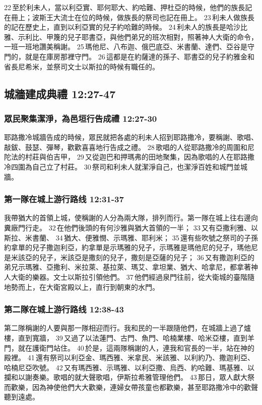 22 至於利未人，當以利亞實、耶何耶大、約哈難、押杜亞的時候，他們的族長記在冊上；波斯王大流士在位的時候，做族長的祭司也記在冊上。 23 利未人做族長的記在歷史上，直到以利亞實的兒子約哈難的時候。 24 利未人的族長是哈沙比雅、示利比、甲篾的兒子耶書亞，與他們弟兄的班次相對，照著神人大衛的命令，一班一班地讚美稱謝。 25 瑪他尼、八布迦、俄巴底亞、米書蘭、達們、亞谷是守門的，就是在庫房那裡守門。 26 這都是在約薩達的孫子、耶書亞的兒子約雅金和省長尼希米，並祭司文士以斯拉的時候有職任的。




\subsection{城牆建成典禮 12:27-47}
\subsubsection{眾民聚集潔淨，為邑垣行告成禮 12:27-30}
耶路撒冷城牆告成的時候，眾民就把各處的利未人招到耶路撒冷，要稱謝、歌唱、敲鈸、鼓瑟、彈琴，歡歡喜喜地行告成之禮。 28 歌唱的人從耶路撒冷的周圍和尼陀法的村莊與伯吉甲， 29 又從迦巴和押瑪弗的田地聚集，因為歌唱的人在耶路撒冷四圍為自己立了村莊。 30 祭司和利未人就潔淨自己，也潔淨百姓和城門並城牆。

\subsubsection{第一隊在城上游行路线 12:31-37}
我帶猶大的首領上城，使稱謝的人分為兩大隊，排列而行。第一隊在城上往右邊向糞廠門行走。 32 在他們後頭的有何沙雅與猶大首領的一半； 33 又有亞撒利雅、以斯拉、米書蘭、 34 猶大、便雅憫、示瑪雅、耶利米； 35 還有些吹號之祭司的子孫約拿單的兒子撒迦利亞，約拿單是示瑪雅的兒子，示瑪雅是瑪他尼的兒子，瑪他尼是米該亞的兒子，米該亞是撒刻的兒子，撒刻是亞薩的兒子； 36 又有撒迦利亞的弟兄示瑪雅、亞撒利、米拉萊、基拉萊、瑪艾、拿坦業、猶大、哈拿尼，都拿著神人大衛的樂器。文士以斯拉引領他們。 37 他們經過泉門往前，從大衛城的臺階隨地勢而上，在大衛宮殿以上，直行到朝東的水門。

\subsubsection{第二隊在城上游行路线 12:38-43}
第二隊稱謝的人要與那一隊相迎而行。我和民的一半跟隨他們，在城牆上過了爐樓，直到寬牆， 39 又過了以法蓮門、古門、魚門、哈楠業樓、哈米亞樓，直到羊門，就在護衛門站住。 40 於是，這兩隊稱謝的人，連我和官長的一半，站在神的殿裡。 41 還有祭司以利亞金、瑪西雅、米拿民、米該雅、以利約乃、撒迦利亞、哈楠尼亞吹號。 42 又有瑪西雅、示瑪雅、以利亞撒、烏西、約哈難、瑪基雅、以攔和以謝奏樂。歌唱的就大聲歌唱，伊斯拉希雅管理他們。 43 那日，眾人獻大祭而歡樂，因為神使他們大大歡樂，連婦女帶孩童也都歡樂，甚至耶路撒冷中的歡聲聽到遠處。


